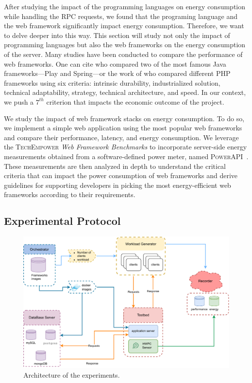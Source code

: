
After studying the impact of the programming languages on energy consumption while handling the RPC requests, we found that the programing language and the web framework significantly impact energy consumption. Therefore, we want to delve deeper into this way.
This section will study not only the impact of programming languages but also the web frameworks on the energy consumption of the server.
Many studies have been conducted to compare the performance of web frameworks.
One can cite \cite{gajewski_analysis_2019} who compared two of the most famous Java frameworks---Play and Spring---or the work of \cite{benmoussa_new_2019} who compared different PHP frameworks using six criteria: intrinsic durability, industrialized solution, technical adaptability, strategy, technical architecture, and speed.
In our context, we push a $7^{th}$ criterion that impacts the economic outcome of the project.

We study the impact of web framework stacks on energy consumption. To do so, we implement a simple web application using the most popular web frameworks and compare their performance, latency, and energy consumption.  We leverage the \textsc{TechEmpower} \emph{Web Framework Benchmarks} to incorporate server-side energy measurements obtained from a software-defined power meter, named \textsc{PowerAPI}~\cite{fieni2020smartwatts}.
These measurements are then analyzed in depth to understand the critical criteria that can impact the power consumption of web frameworks and derive guidelines for supporting developers in picking the most energy-efficient web frameworks according to their requirements.

\subsection{Experimental Protocol}

\begin{figure}[!hbt]
    \centering
    \includegraphics[width=.8\columnwidth]{imgs/architecture}
    \caption[Architecture]{Architecture of the experiments.}
    \label{fig:architecture}
\end{figure}

